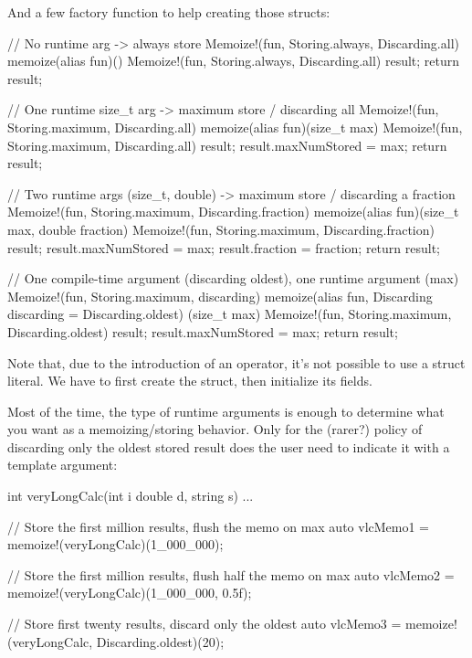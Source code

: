And a few factory function to help creating those  structs:

\begin{dcode}
// No runtime arg -> always store
Memoize!(fun, Storing.always, Discarding.all)
memoize(alias fun)()
{
    Memoize!(fun, 
             Storing.always, 
             Discarding.all) result;
    return result;
}

// One runtime size_t arg -> maximum store / discarding all
Memoize!(fun, Storing.maximum, Discarding.all)
memoize(alias fun)(size_t max)
{
    Memoize!(fun, 
             Storing.maximum, 
             Discarding.all) result;
    result.maxNumStored = max;
    return result;
}

// Two runtime args (size_t, double) -> maximum store / discarding a fraction
Memoize!(fun, Storing.maximum, Discarding.fraction)
memoize(alias fun)(size_t max, double fraction)
{
    Memoize!(fun, 
             Storing.maximum, 
             Discarding.fraction) result;
    result.maxNumStored = max;
    result.fraction = fraction;
    return result;
}

// One compile-time argument (discarding oldest), one runtime argument (max)
Memoize!(fun, Storing.maximum, discarding)
memoize(alias fun, Discarding discarding = Discarding.oldest)
(size_t max)
{
    Memoize!(fun, 
             Storing.maximum, 
             Discarding.oldest) result;
    result.maxNumStored = max;
    return result;
}
\end{dcode}

Note that, due to the introduction of an  operator, it's not possible to use a struct literal. We have to first create the struct, then initialize its fields.

Most of the time, the type of runtime arguments is enough to determine what you want as a memoizing/storing behavior. Only for the (rarer?) policy of discarding only the oldest stored result does the user need to indicate it with a template argument:

\begin{dcode}
int veryLongCalc(int i double d, string s) { ... }

// Store the first million results, flush the memo on max
auto vlcMemo1 = memoize!(veryLongCalc)(1_000_000);

// Store the first million results, flush half the memo on max
auto vlcMemo2 = memoize!(veryLongCalc)(1_000_000, 0.5f);

// Store first twenty results, discard only the oldest
auto vlcMemo3 = memoize!(veryLongCalc, Discarding.oldest)(20);
\end{dcode}

